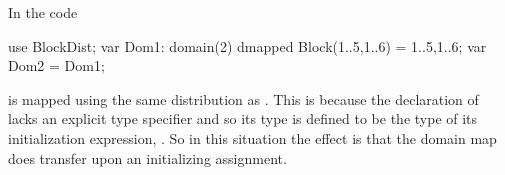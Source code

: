 \begin{example}
In the code
\begin{chapel}
use BlockDist;
var Dom1: domain(2) dmapped Block({1..5,1..6}) = {1..5,1..6};
var Dom2 = Dom1;
\end{chapel}
 is mapped using the same distribution as .
This is because the declaration of  lacks an explicit
type specifier and so its type is defined to be the type of its
initialization expression, . So in this situation
the effect is that the domain map does transfer upon
an initializing assignment.
\end{example}
